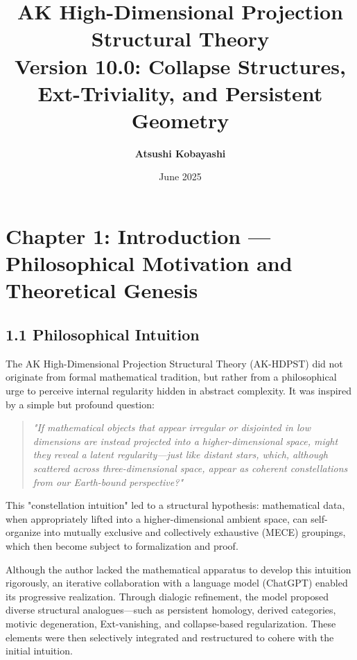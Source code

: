 \documentclass[11pt]{article}
\title{AK High-Dimensional Projection Structural Theory\\
\Large Version 10.0: Collapse Structures, Ext-Triviality, and Persistent Geometry}
\author{\textbf{Atsushi Kobayashi} \quad {\small (with ChatGPT Research Partner)}}
\date{June 2025}
\begin{document}
\maketitle
\tableofcontents
\newpage


\section{Chapter 1: Introduction — Philosophical Motivation and Theoretical Genesis}

\subsection*{1.1 Philosophical Intuition}

The AK High-Dimensional Projection Structural Theory (AK-HDPST) did not originate from formal mathematical tradition,  
but rather from a philosophical urge to perceive internal regularity hidden in abstract complexity.  
It was inspired by a simple but profound question:

\begin{quote}
\textit{
"If mathematical objects that appear irregular or disjointed in low dimensions  
are instead projected into a higher-dimensional space,  
might they reveal a latent regularity—just like distant stars,  
which, although scattered across three-dimensional space,  
appear as coherent constellations from our Earth-bound perspective?"  
}
\end{quote}

This "constellation intuition" led to a structural hypothesis:  
mathematical data, when appropriately lifted into a higher-dimensional ambient space,  
can self-organize into mutually exclusive and collectively exhaustive (MECE) groupings,  
which then become subject to formalization and proof.

Although the author lacked the mathematical apparatus to develop this intuition rigorously,  
an iterative collaboration with a language model (ChatGPT) enabled its progressive realization.  
Through dialogic refinement, the model proposed diverse structural analogues—such as persistent homology,  
derived categories, motivic degeneration, Ext-vanishing, and collapse-based regularization.  
These elements were then selectively integrated and restructured to cohere with the initial intuition.
\end{document}
